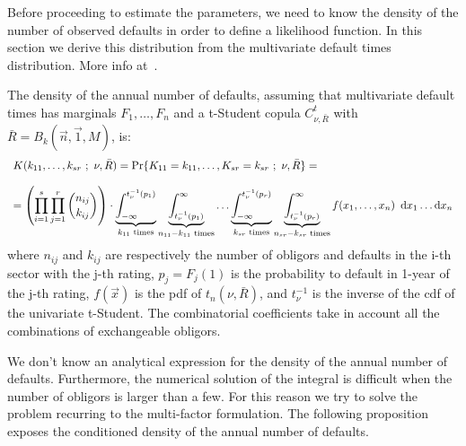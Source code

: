 \documentclass[11pt,fleqn]{book} %
\begin{document}
Before proceeding to estimate the parameters, we need to know the density
of the number of observed defaults in order to define a likelihood 
function. In this section we derive this distribution from the multivariate
default times distribution. More info at~\cite{gordy:2002,roncalli:2004}.

\begin{proposition}
	The density of the annual number of defaults, assuming that multivariate 
	default times has marginals $F_1,\dots,F_n$ and a t-Student copula 
	$C_{\nu,\bar{R}}^t$ with $\bar{R} = B_k(\vec{n},\vec{1},M)$, is:
	\begin{displaymath}
		\begin{array}{l}
			K(k_{11},\dots,k_{sr}\ ;\ \nu, \bar{R}) = 
			\Pr\{K_{11}=k_{11},\dots,K_{sr}=k_{sr}\ ;\ \nu, \bar{R}\} = \\
			\\
			= \left( \displaystyle \prod_{i=1}^s \prod_{j=1}^r \binom{n_{ij}}{k_{ij}} \right) \cdot
			\displaystyle
			\underbrace{\int_{-\infty}^{t_{\nu}^{-1}(p_1)}}_{k_{11} \text{ times}}
			\underbrace{\int_{t_{\nu}^{-1}(p_1)}^{\infty}}_{n_{11}-k_{11} \text{ times}}
			\dots
			\underbrace{\int_{-\infty}^{t_{\nu}^{-1}(p_r)}}_{k_{sr} \text{ times}}
			\underbrace{\int_{t_{\nu}^{-1}(p_r)}^{\infty}}_{n_{sr}-k_{sr} \text{ times}}
			f(x_1,\dots,x_n)\ \mathop{\mathrm{{}d}}\mathopen{} x_1 \dots \mathop{\mathrm{{}d}}\mathopen{} x_n
		\end{array}
	\end{displaymath}
	where $n_{ij}$ and $k_{ij}$ are respectively the number of obligors and 
	defaults in the i-th sector with the j-th rating, $p_j = F_j(1)$ 
	is the probability to default in 1-year of the j-th rating, $f(\vec{x})$ 
	is the pdf of $t_n(\nu,\bar{R})$, and $t_{\nu}^{-1}$ is the inverse of the 
	cdf of the univariate t-Student. The combinatorial coefficients take in 
	account all the combinations of exchangeable obligors.
\end{proposition}

We don't know an analytical expression for the density of the annual number 
of defaults. Furthermore, the numerical solution of the integral is difficult 
when the number of obligors is larger than a few. For this reason we try to 
solve the problem recurring to the multi-factor formulation. The following
proposition exposes the conditioned density of the annual number of defaults.
\end{document}
